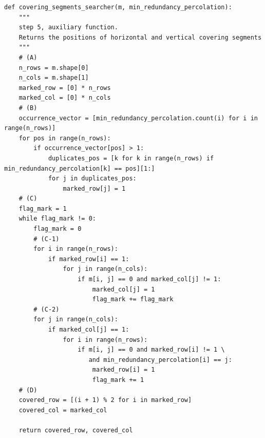 \documentclass[12pt]{ClasseMatematicamente}
\begin{document}
\begin{small}
\begin{lstlisting}
def covering_segments_searcher(m, min_redundancy_percolation):
	"""
	step 5, auxiliary function.
	Returns the positions of horizontal and vertical covering segments
	"""
	# (A)
	n_rows = m.shape[0]
	n_cols = m.shape[1]
	marked_row = [0] * n_rows
	marked_col = [0] * n_cols
	# (B)
	occurrence_vector = [min_redundancy_percolation.count(i) for i in range(n_rows)]
	for pos in range(n_rows):
		if occurrence_vector[pos] > 1:
			duplicates_pos = [k for k in range(n_rows) if min_redundancy_percolation[k] == pos][1:]
			for j in duplicates_pos:
				marked_row[j] = 1
	# (C)
	flag_mark = 1
	while flag_mark != 0:
		flag_mark = 0
		# (C-1)
		for i in range(n_rows):
			if marked_row[i] == 1:
				for j in range(n_cols):
					if m[i, j] == 0 and marked_col[j] != 1:
						marked_col[j] = 1
						flag_mark += flag_mark
		# (C-2)
		for j in range(n_cols):
			if marked_col[j] == 1:
				for i in range(n_rows):
					if m[i, j] == 0 and marked_row[i] != 1 \
					   and min_redundancy_percolation[i] == j:
						marked_row[i] = 1
						flag_mark += 1
	# (D)
	covered_row = [(i + 1) % 2 for i in marked_row]
	covered_col = marked_col
	
	return covered_row, covered_col

\end{lstlisting}
\end{small}
\end{document}
